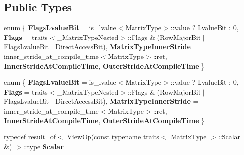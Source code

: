 \subsection*{Public Types}
\begin{DoxyCompactItemize}
\item 
\mbox{\label{struct_eigen_1_1internal_1_1traits_3_01_cwise_unary_view_3_01_view_op_00_01_matrix_type_01_4_01_4_a5ea20cfb7cea66780b16842782a3d090}} 
enum \{ \newline
{\bfseries Flags\+Lvalue\+Bit} = is\+\_\+lvalue$<$Matrix\+Type$>$\+:\+:value ? Lvalue\+Bit \+: 0, 
{\bfseries Flags} = traits$<$\+\_\+\+Matrix\+Type\+Nested$>$\+:\+:Flags \& (Row\+Major\+Bit $\vert$ Flags\+Lvalue\+Bit $\vert$ Direct\+Access\+Bit), 
{\bfseries Matrix\+Type\+Inner\+Stride} = inner\+\_\+stride\+\_\+at\+\_\+compile\+\_\+time$<$Matrix\+Type$>$\+:\+:ret, 
{\bfseries Inner\+Stride\+At\+Compile\+Time}, 
\newline
{\bfseries Outer\+Stride\+At\+Compile\+Time}
 \}
\item 
\mbox{\label{struct_eigen_1_1internal_1_1traits_3_01_cwise_unary_view_3_01_view_op_00_01_matrix_type_01_4_01_4_a859044b7ab44c762738dfc35586948fe}} 
enum \{ \newline
{\bfseries Flags\+Lvalue\+Bit} = is\+\_\+lvalue$<$Matrix\+Type$>$\+:\+:value ? Lvalue\+Bit \+: 0, 
{\bfseries Flags} = traits$<$\+\_\+\+Matrix\+Type\+Nested$>$\+:\+:Flags \& (Row\+Major\+Bit $\vert$ Flags\+Lvalue\+Bit $\vert$ Direct\+Access\+Bit), 
{\bfseries Matrix\+Type\+Inner\+Stride} = inner\+\_\+stride\+\_\+at\+\_\+compile\+\_\+time$<$Matrix\+Type$>$\+:\+:ret, 
{\bfseries Inner\+Stride\+At\+Compile\+Time}, 
\newline
{\bfseries Outer\+Stride\+At\+Compile\+Time}
 \}
\item 
\mbox{\label{struct_eigen_1_1internal_1_1traits_3_01_cwise_unary_view_3_01_view_op_00_01_matrix_type_01_4_01_4_ae388eca20138f05948bdcc57b1cf4af7}} 
typedef \hyperlink{struct_eigen_1_1internal_1_1result__of}{result\+\_\+of}$<$ View\+Op(const typename \hyperlink{struct_eigen_1_1internal_1_1traits}{traits}$<$ Matrix\+Type $>$\+::Scalar \&) $>$\+::type {\bfseries Scalar}

\end{DoxyCompactItemize}
